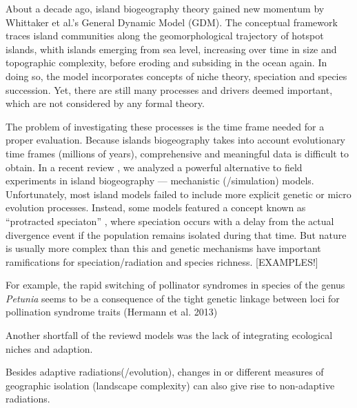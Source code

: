 \documentclass[a4paper]{scrartcl}
\begin{document}
About a decade ago, island biogeography theory gained new momentum by Whittaker et al.'s General Dynamic Model (GDM). %
The conceptual framework traces island communities along the geomorphological trajectory of hotspot islands,
whith islands emerging from sea level, increasing over time in size and topographic complexity, before eroding and subsiding in the ocean again.
In doing so, the model incorporates concepts of niche theory, speciation and species succession.
Yet, there are still many processes and drivers deemed important, which are not considered by any formal theory.


The problem of investigating these processes is the time frame needed for a proper evaluation.
Because islands biogeography takes into account evolutionary time frames (millions of years),
comprehensive and meaningful data is difficult to obtain.
In a recent review \cite{leidinger2017biodiversity}, we analyzed a powerful alternative to field experiments in island biogeography
--- mechanistic (/simulation) models.
Unfortunately, most island models failed to include more explicit genetic or micro evolution processes.
Instead, some models featured a concept known as ``protracted speciaton'' \cite{rosindellXXX}, where speciation occurs with a delay from the actual
divergence event if the population remains isolated during that time.
But nature is usually more complex than this and genetic mechanisms have important ramifications for speciation/radiation and species richness.
[EXAMPLES!]

For example, the rapid switching of pollinator syndromes in species of the genus \textit{Petunia} %
seems to be a consequence of the tight genetic linkage between loci for pollination syndrome traits (Hermann et al. 2013) %

Another shortfall of the reviewd models was the lack of integrating ecological niches and adaption.

Besides adaptive radiations(/evolution), changes in or different measures of geographic isolation (landscape complexity) can also give rise to non-adaptive radiations.
\end{document}
